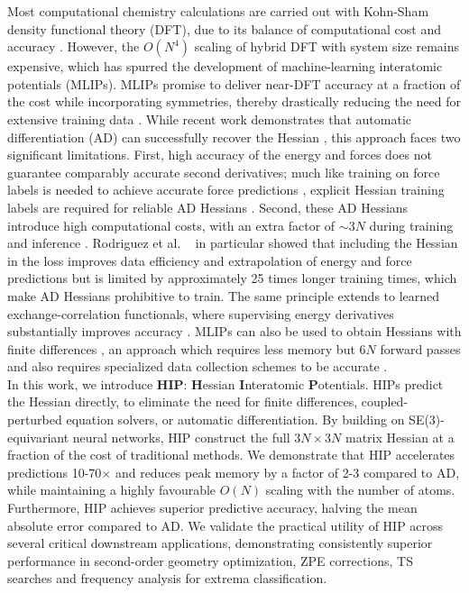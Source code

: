 \documentclass[pdflatex,sn-mathphys-num]{sn-jnl}%
\theoremstyle{thmstyleone}%
\theoremstyle{thmstyletwo}%
\theoremstyle{thmstylethree}%
\begin{document}
Most computational chemistry calculations are carried out with Kohn-Sham density functional theory \citep{kohn1965} (DFT), due to its balance of computational cost and accuracy \citep{bursch2022}.
However, the $O(N^4)$ scaling of hybrid DFT with system size remains expensive, which has spurred the development of machine-learning interatomic potentials (MLIPs). MLIPs promise to deliver near-DFT accuracy at a fraction of the cost while incorporating symmetries, thereby drastically reducing the need for extensive training data \citep{schutt2018,thomas2018,gasteiger2021,schutt2021,batatia2022,batzner2022}.
While recent work demonstrates that automatic differentiation (AD) can successfully recover the Hessian \citep{yang2024, yuan2024, gonnheimer2025, rodriguez2025, williams2025, cui2025horm}, this approach faces two significant limitations. First, high accuracy of the energy and forces does not guarantee comparably accurate second derivatives; much like training on force labels is needed to achieve accurate force predictions \cite{christensen2020forces}, explicit Hessian training labels are required for reliable AD Hessians \citep{zhao2025, cui2025horm}. 
Second, these AD Hessians introduce high computational costs, with an extra factor of $\sim{}3N$ during training and inference \citep{yuan2024,gonnheimer2025,rodriguez2025,williams2025,cui2025horm}. 
Rodriguez et al. ~\cite{rodriguez2025} in particular showed that including the Hessian in the loss improves data efficiency and extrapolation of energy and force predictions but is limited by approximately 25 times longer training times, which make AD Hessians prohibitive to train. The same principle extends to learned exchange-correlation functionals, where supervising energy derivatives substantially improves accuracy \citep{eberhard2026derivative}.
MLIPs can also be used to obtain Hessians with finite differences \citep{gonnheimer2025, fu2025}, an approach which requires less memory but $6N$ forward passes and also requires specialized data collection schemes to be accurate \cite{wander2025accessing}.\\

In this work, we introduce \textbf{HIP}: \textbf{H}essian \textbf{I}nteratomic \textbf{P}otentials. HIPs predict the Hessian directly, to eliminate the need for finite differences, coupled-perturbed equation solvers, or automatic differentiation. By building on SE(3)-equivariant neural networks, HIP construct the full $3N \times 3N$ matrix Hessian at a fraction of the cost of traditional methods. We demonstrate that HIP accelerates predictions 10-70$\times$ and reduces peak memory by a factor of 2-3 compared to AD, while maintaining a highly favourable $O(N)$ scaling with the number of atoms. Furthermore, HIP achieves superior predictive accuracy, halving the mean absolute error compared to AD. We validate the practical utility of HIP across several critical downstream applications, demonstrating consistently superior performance in second-order geometry optimization, ZPE corrections, TS searches and frequency analysis for extrema classification.
\end{document}
